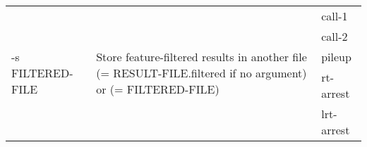 {\small
\begin{tabular}{@{}p{}p{}l@{}}
\multirow{5}{=}{-s FILTERED-FILE} & \multirow{5}{=}{Store feature-filtered results in another file (= RESULT-FILE.filtered if no argument) or (= FILTERED-FILE)} & call-1 \\
 &  & call-2 \\
 &  & pileup \\
 &  & rt-arrest \\
 &  & lrt-arrest \\
\end{tabular}\\
}
